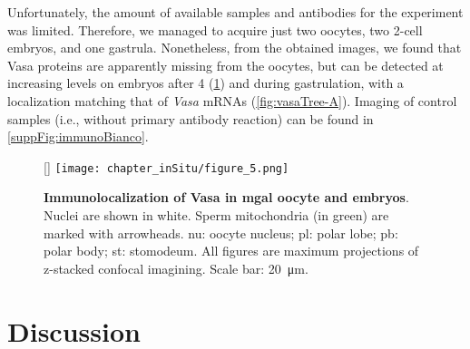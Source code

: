 Unfortunately, the amount of available samples and antibodies for the experiment was limited. Therefore, we managed to acquire just two oocytes, two 2-cell embryos, and one gastrula. Nonetheless, from the obtained images, we found that Vasa proteins are apparently missing from the oocytes, but can be detected at increasing levels on embryos after \qty{4}{\hpf} (\cref{fig:immuno}) and during gastrulation, with a localization matching that of \textit{Vasa} mRNAs (\cref{fig:vasaTree-A}). Imaging of control samples (i.e., without primary antibody reaction) can be found in \cref{suppFig:immunoBianco}.

\begin{figure}
	[\FBwidth]
	{\texttt{[image: chapter\_inSitu/figure\_5.png]}}
	{\caption[\textbf{Immunolocalization of Vasa in \gls{mgal} oocyte and embryos}]
		{
			\textbf{Immunolocalization of Vasa in \gls{mgal} oocyte and embryos}. Nuclei are shown in white. Sperm mitochondria (in green) are marked with arrowheads. nu: oocyte nucleus; pl: polar lobe; pb: polar body; st: stomodeum. All figures are maximum projections of z-stacked confocal imagining. Scale bar: \qty{20}{\um}.
		}
		\label{fig:immuno}}
\end{figure}

\section{Discussion} \label{chapter:insitu-discussion}
